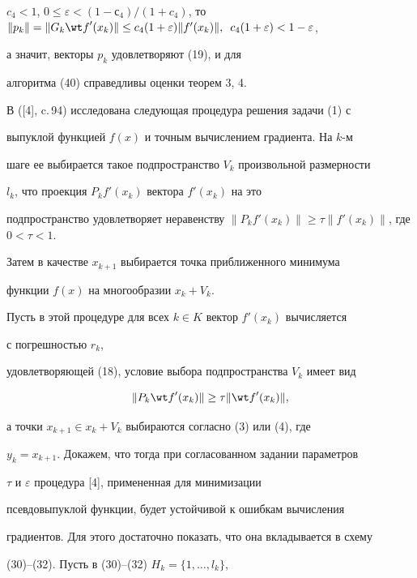 $c_4{<}1$, $0{\le}\varepsilon{<}(1-с_4)/(1+c_4)$, то $\|{p_k}


\|=\|{G_k{\wt f}'(x_k)}\|\le c_4(1+\varepsilon)


\|{{f}'(x_k)}\|,\enspace c_4(1+\varepsilon)<1-\varepsilon$,


а значит, векторы $p_k$ удовлетворяют (19), и для


алгоритма (40) справедливы оценки теорем 3, 4.





В ([4], c.\,94) исследована следующая процедура решения задачи (1) с


выпуклой функцией $f(x)$ и точным вычислением градиента. На $k$-м


шаге ее выбирается такое подпространство $V_k$ произвольной размерности


$l_k$, что проекция $P_k{f}'(x_k)$ вектора ${f}'(x_k)$ на это


подпространство удовлетворяет неравенству $\|{P_k{f}'(x_k)}


\|\ge\tau\|{{f}'(x_k)}\|$, где $0<\tau<1$.


Затем в качестве $x_{k+1}$ выбирается точка приближенного минимума


функции $f(x)$ на многообразии $x_k+V_k$.





Пусть в этой процедуре для всех $k\in K$ вектор ${f}'(x_k)$ вычисляется


с погрешностью $r_k$,


удовлетворяющей (18), условие выбора подпространства $V_k$ имеет вид


\begin{equation}


\|{P_k{\wt f}'(x_k)}\|\ge\tau\|{{\wt f}'(x_k)}\|,


\end{equation}


а точки $x_{k+1}\in x_k+V_k$ выбираются согласно (3) или (4), где


$y_k=x_{k+1}$. Докажем, что тогда при согласованном задании параметров


$\tau$ и $\varepsilon$ процедура [4], примененная для минимизации


псевдовыпуклой функции, будет устойчивой к ошибкам вычисления


градиентов. Для этого достаточно показать, что она вкладывается в схему


(30)--(32). Пусть в (30)--(32) $H_k=\{{1,\dotsc,l_k}\}$,


